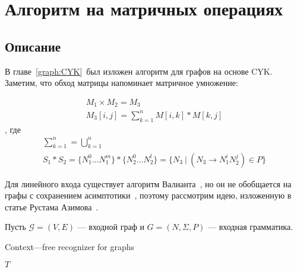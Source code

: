 \section{Алгоритм на матричных операциях}
\subsection{Описание}
\label{Matrix-CFPQ}
В главе~\ref{graph:CYK}~был изложен алгоритм для графов на основе CYK. Заметим, что обход матрицы напоминает матричное умножение:

\begin{gather*}
M_1 \times M_2 = M_3 \\
M_3[i,j] = \sum_{k=1}^{n} M[i,k] * M[k,j]
\end{gather*}
, где
\begin{gather*}
\sum_{k=1}^{n} = \bigcup_{k=1}^{n} \\
S_1 * S_2 = \{N_1^0 ... N_1^m\} * \{N_2^0 ... N_2^l\} = \{N_3~|~(N_3 \rightarrow N_1^i N_2^j) \in P\}
\end{gather*}

Для линейного входа существует алгоритм Валианта~\cite{Valiant:1975:GCR:1739932.1740048}, но он не обобщается на графы с сохранением асимптотики~\cite{Yannakakis}, поэтому рассмотрим идею, изложенную в статье Рустама Азимова~\cite{Azimov:2018:CPQ:3210259.3210264}.

Пусть $\mathcal{G} = (V, E)$ --- входной граф и $G = (N,\Sigma,P)$ --- входная грамматика.

\begin{algorithm}[H]
\begin{algorithmic}[1]
\caption{Context---free recognizer for graphs}
\label{alg:graphParse}
    
    \EndFor    
       
    \EndWhile
\State \Return $T$
\EndFunction
\end{algorithmic}
\end{algorithm}


